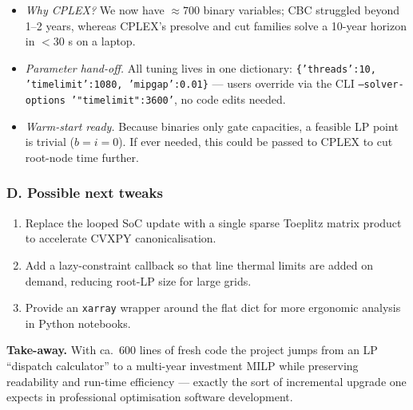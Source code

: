 \begin{itemize}
    \item \emph{Why CPLEX?}  We now have \(\approx 700\) binary variables; CBC struggled beyond 1–2 years,
          whereas CPLEX’s presolve and cut families solve a 10-year horizon in \(< 30\) s on a laptop.
    \item \emph{Parameter hand-off.}  All tuning lives in one dictionary:  
          \texttt{\{'threads':10, 'timelimit':1080, 'mipgap':0.01\}} — users override via the CLI
          \texttt{--solver-options '{"timelimit":3600}'}, no code edits needed.
    \item \emph{Warm-start ready.}  Because binaries only gate capacities, a feasible LP point is trivial
          (\(b=i=0\)).  If ever needed, this could be passed to CPLEX to cut root-node time further.
\end{itemize}

\subsubsection*{D.  Possible next tweaks}

\begin{enumerate}[label=\alph*)]
    \item Replace the looped SoC update with a single sparse Toeplitz matrix product to
          accelerate CVXPY canonicalisation.  
    \item Add a lazy-constraint callback so that line thermal limits are added on
          demand, reducing root-LP size for large grids.  
    \item Provide an \texttt{xarray} wrapper around the flat dict for more ergonomic
          analysis in Python notebooks.
\end{enumerate}

\vspace{0.5em}
\noindent
\textbf{Take-away.}  
With ca.~600 lines of fresh code the project jumps from an LP “dispatch calculator” to a
multi-year investment MILP while preserving readability and run-time efficiency —
exactly the sort of incremental upgrade one expects in professional optimisation
software development.